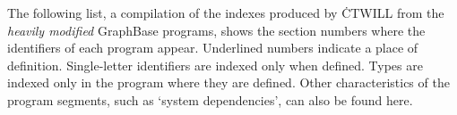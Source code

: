 \preinx %
\bigskip
\noindent
The following list, a compilation of the indexes produced by \.{CTWILL}
from the {\it heavily modified\/}
GraphBase programs, shows the section numbers where the identifiers of each
program appear. Underlined numbers indicate a place of definition.
Single-letter identifiers are indexed only when defined.
Types are indexed only in the program where they are defined.
Other characteristics of the program segments, such as `system dependencies',
can also be found here.
\inx %
